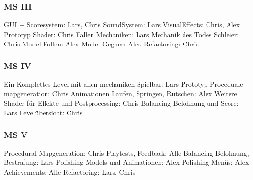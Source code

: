 \documentclass[10pt]{article}
\begin{document}
\vspace{0.5cm}
\subsubsection{MS III}

GUI + Scoresystem: Lars, Chris\newline
SoundSystem: Lars\newline
VisualEffects: Chris, Alex\newline
Prototyp Shader: Chris\newline
Fallen Mechaniken: Lars\newline
Mechanik des Todes Schleier: Chris\newline
Model Fallen: Alex\newline
Model Gegner: Alex\newline
Refactoring: Chris\newline

\vspace{0.5cm}
\subsubsection{MS IV}

Ein Komplettes Level mit allen mechaniken Spielbar: Lars\newline
Prototyp Proceduale mapgeneration: Chris\newline
Animationen Laufen, Springen, Rutschen: Alex\newline
Weitere Shader für Effekte und Postprocessing: Chris\newline
Balancing Belohnung und Score: Lars\newline
Levelübersicht: Chris\newline

\vspace{0.5cm}
\subsubsection{MS V}

Procedural Mapgeneration: Chris\newline
Playtests, Feedback: Alle\newline
Balancing Belohnung, Bestrafung: Lars\newline
Polishing Models und Animationen: Alex\newline
Polishing Menüs: Alex\newline
Achievements: Alle\newline
Refactoring: Lars, Chris\newline
\end{document}
